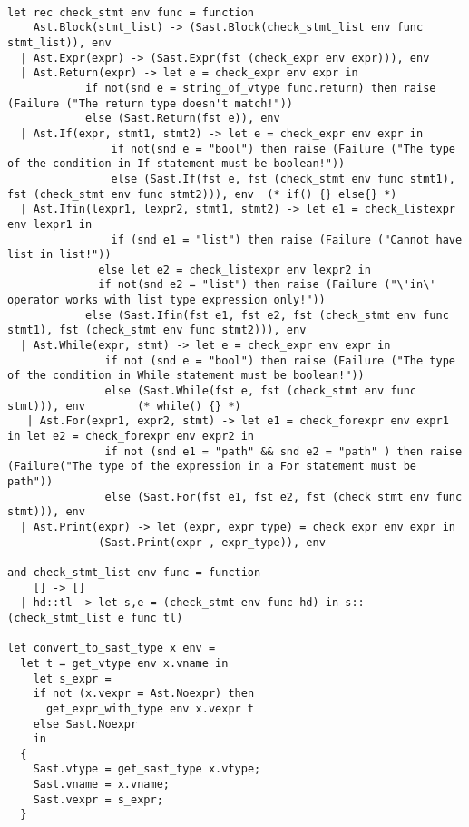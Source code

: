\documentclass[11pt]{article}
\begin{document}
\begin{listing}[H]
  \begin{verbatim}

let rec check_stmt env func = function
    Ast.Block(stmt_list) -> (Sast.Block(check_stmt_list env func stmt_list)), env
  | Ast.Expr(expr) -> (Sast.Expr(fst (check_expr env expr))), env
  | Ast.Return(expr) -> let e = check_expr env expr in
            if not(snd e = string_of_vtype func.return) then raise (Failure ("The return type doesn't match!"))
            else (Sast.Return(fst e)), env
  | Ast.If(expr, stmt1, stmt2) -> let e = check_expr env expr in
                if not(snd e = "bool") then raise (Failure ("The type of the condition in If statement must be boolean!"))
                else (Sast.If(fst e, fst (check_stmt env func stmt1), fst (check_stmt env func stmt2))), env  (* if() {} else{} *)
  | Ast.Ifin(lexpr1, lexpr2, stmt1, stmt2) -> let e1 = check_listexpr env lexpr1 in
                if (snd e1 = "list") then raise (Failure ("Cannot have list in list!"))
              else let e2 = check_listexpr env lexpr2 in
              if not(snd e2 = "list") then raise (Failure ("\'in\' operator works with list type expression only!"))
            else (Sast.Ifin(fst e1, fst e2, fst (check_stmt env func stmt1), fst (check_stmt env func stmt2))), env
  | Ast.While(expr, stmt) -> let e = check_expr env expr in
               if not (snd e = "bool") then raise (Failure ("The type of the condition in While statement must be boolean!"))
               else (Sast.While(fst e, fst (check_stmt env func stmt))), env        (* while() {} *)
   | Ast.For(expr1, expr2, stmt) -> let e1 = check_forexpr env expr1 in let e2 = check_forexpr env expr2 in
               if not (snd e1 = "path" && snd e2 = "path" ) then raise (Failure("The type of the expression in a For statement must be path"))
               else (Sast.For(fst e1, fst e2, fst (check_stmt env func stmt))), env
  | Ast.Print(expr) -> let (expr, expr_type) = check_expr env expr in
              (Sast.Print(expr , expr_type)), env

and check_stmt_list env func = function
    [] -> []
  | hd::tl -> let s,e = (check_stmt env func hd) in s::(check_stmt_list e func tl)

let convert_to_sast_type x env =
  let t = get_vtype env x.vname in
    let s_expr =
    if not (x.vexpr = Ast.Noexpr) then
      get_expr_with_type env x.vexpr t
    else Sast.Noexpr
    in
  {
    Sast.vtype = get_sast_type x.vtype;
    Sast.vname = x.vname;
    Sast.vexpr = s_expr;
  }


\end{verbatim}
\end{listing}
\end{document}
